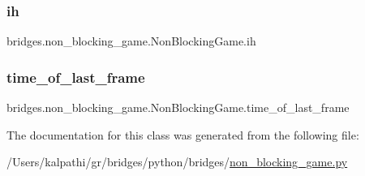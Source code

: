 \subsubsection{\texorpdfstring{ih}{ih}}
{\footnotesize\ttfamily bridges.\+non\+\_\+blocking\+\_\+game.\+Non\+Blocking\+Game.\+ih}

\mbox{\label{classbridges_1_1non__blocking__game_1_1_non_blocking_game_a828f1abe5336e15ffc718411378da266}} 
\subsubsection{\texorpdfstring{time\_of\_last\_frame}{time\_of\_last\_frame}}
{\footnotesize\ttfamily bridges.\+non\+\_\+blocking\+\_\+game.\+Non\+Blocking\+Game.\+time\+\_\+of\+\_\+last\+\_\+frame}



The documentation for this class was generated from the following file\+:\begin{DoxyCompactItemize}
\item 
/\+Users/kalpathi/gr/bridges/python/bridges/\mbox{\hyperlink{non__blocking__game_8py}{non\+\_\+blocking\+\_\+game.\+py}}\end{DoxyCompactItemize}
